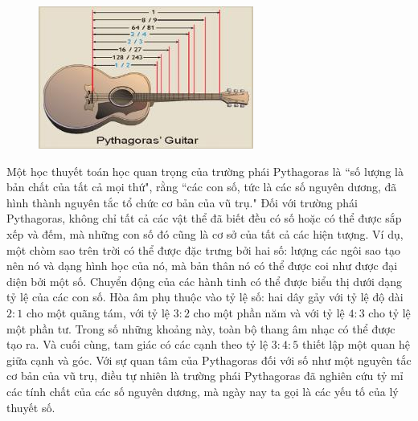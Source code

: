\begin{multicols}{2}
	\begin{figure}[H]
		\vspace*{-5pt}
		\centering
		\captionsetup{labelformat= empty, justification=centering}
		\includegraphics[width= 1\linewidth]{3}
		\vspace*{-15pt}
	\end{figure}
	Một học thuyết toán học quan trọng của trường phái Pythagoras là ``số lượng là bản chất của tất cả mọi thứ", rằng ``các con số, tức là các số nguyên dương, đã hình thành nguyên tắc tổ chức cơ bản của vũ trụ." Đối với trường phái Pythagoras, không chỉ tất cả các vật thể đã biết đều có số hoặc có thể được sắp xếp và đếm, mà những con số đó cũng là cơ sở của tất cả các hiện tượng. Ví dụ, một chòm sao trên trời có thể được đặc trưng bởi hai số: lượng các ngôi sao tạo nên nó và dạng hình học của nó, mà bản thân nó có thể được coi như được đại diện bởi một số. Chuyển động của các hành tinh có thể được biểu thị dưới dạng tỷ lệ của các con số. Hòa âm phụ thuộc vào tỷ lệ số: hai dây gảy với tỷ lệ độ dài $2:1$ cho một quãng tám, với tỷ lệ $3:2$ cho một phần năm và với tỷ lệ $4:3$ cho tỷ lệ một phần tư. Trong số những khoảng này, toàn bộ thang âm nhạc có thể được tạo ra. Và cuối cùng, tam giác có các cạnh theo tỷ lệ $3:4:5$ thiết lập một quan hệ giữa cạnh và góc. Với sự quan tâm của Pythagoras đối với số như một nguyên tắc cơ bản của vũ trụ, điều tự nhiên là trường phái Pythagoras đã nghiên cứu tỷ mỉ các tính chất của các số nguyên dương, mà ngày nay ta gọi là các yếu tố của lý \linebreak thuyết số.
	\begin{figure}[H]

\end{figure}
\end{multicols}
